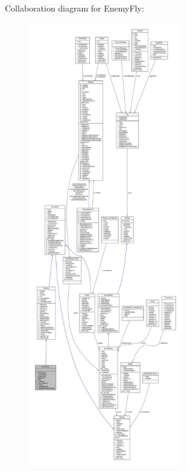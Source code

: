 Collaboration diagram for Enemy\+Fly\+:
\nopagebreak
\begin{figure}[H]
\begin{center}
\leavevmode
\includegraphics[height=550pt]{class_enemy_fly__coll__graph}
\end{center}
\end{figure}
